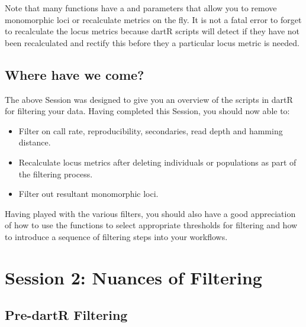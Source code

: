 \documentclass[
  letterpaper,
  DIV=11,
  numbers=noendperiod]{scrreprt}
\providecommand{\tightlist}{%
  \setlength{\itemsep}{0pt}\setlength{\parskip}{0pt}}\usepackage{longtable,booktabs,array}
\let\textttOrig\texttt
\renewcommand{\texttt}[1]{\textttOrig{\color{blue}{#1}}}
\begin{document}
Note that many functions have a \texttt{mono.rm} and \texttt{recalc}
parameters that allow you to remove monomorphic loci or recalculate
metrics on the fly. It is not a fatal error to forget to recalculate the
locus metrics because dartR scripts will detect if they have not been
recalculated and rectify this before they a particular locus metric is
needed.

\hypertarget{where-have-we-come}{%
\subsection*{Where have we come?}\label{where-have-we-come}}

The above Session was designed to give you an overview of the scripts in
dartR for filtering your data. Having completed this Session, you should
now able to:

\begin{itemize}
\tightlist
\item
  Filter on call rate, reproducibility, secondaries, read depth and
  hamming distance.
\item
  Recalculate locus metrics after deleting individuals or populations as
  part of the filtering process.
\item
  Filter out resultant monomorphic loci.
\end{itemize}

Having played with the various filters, you should also have a good
appreciation of how to use the \texttt{gl.report} functions to select
appropriate thresholds for filtering and how to introduce a sequence of
filtering steps into your workflows.

\hypertarget{session-2-nuances-of-filtering}{%
\section*{Session 2: Nuances of
Filtering}\label{session-2-nuances-of-filtering}}


\hypertarget{pre-dartr-filtering}{%
\subsection*{Pre-dartR Filtering}\label{pre-dartr-filtering}}
\end{document}
